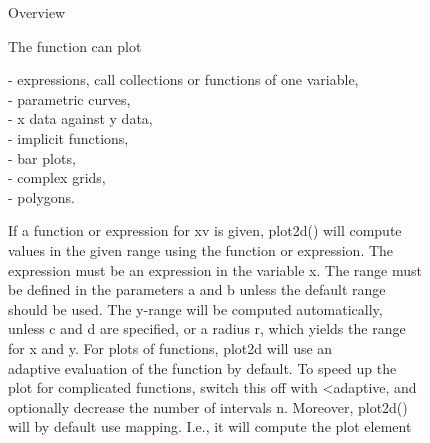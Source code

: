 \documentclass[a4paper,10pt]{article}
\begin{document}
\begin{eulernotebook}
\begin{eulercomment}
\begin{eulercomment}
\begin{eulercomment}
\begin{eulercomment}
\begin{eulercomment}
\begin{eulercomment}
\begin{eulercomment}
\begin{eulercomment}
\begin{eulercomment}
\begin{eulercomment}
\begin{eulercomment}
\begin{eulercomment}
\begin{eulercomment}
\begin{eulercomment}
\begin{eulercomment}
\begin{eulercomment}
\begin{eulercomment}
\begin{eulercomment}
\begin{eulercomment}
\begin{eulercomment}
\begin{eulercomment}
\begin{eulercomment}
\begin{eulercomment}
\begin{eulercomment}
\begin{eulercomment}
\begin{eulercomment}
\begin{eulercomment}
\begin{eulercomment}
\begin{eulercomment}
\begin{eulercomment}
\begin{eulercomment}
\begin{eulercomment}
\begin{eulercomment}
\begin{eulercomment}
\begin{eulercomment}
\begin{eulercomment}
\begin{eulercomment}

Overview

The function can plot

- expressions, call collections or functions of one variable,\\
- parametric curves,\\
- x data against y data,\\
- implicit functions,\\
- bar plots,\\
- complex grids,\\
- polygons.

If a function or expression for xv is given, plot2d() will compute\\
values in the given range using the function or expression. The\\
expression must be an expression in the variable x. The range must\\
be defined in the parameters a and b unless the default range\\
[-2,2] should be used. The y-range will be computed automatically,\\
unless c and d are specified, or a radius r, which yields the range\\
[-r,r] for x and y. For plots of functions, plot2d will use an\\
adaptive evaluation of the function by default. To speed up the\\
plot for complicated functions, switch this off with \textless{}adaptive, and\\
optionally decrease the number of intervals n. Moreover, plot2d()\\
will by default use mapping. I.e., it will compute the plot element\\

\end{eulercomment}
\end{eulercomment}
\end{eulercomment}
\end{eulercomment}
\end{eulercomment}
\end{eulercomment}
\end{eulercomment}
\end{eulercomment}
\end{eulercomment}
\end{eulercomment}
\end{eulercomment}
\end{eulercomment}
\end{eulercomment}
\end{eulercomment}
\end{eulercomment}
\end{eulercomment}
\end{eulercomment}
\end{eulercomment}
\end{eulercomment}
\end{eulercomment}
\end{eulercomment}
\end{eulercomment}
\end{eulercomment}
\end{eulercomment}
\end{eulercomment}
\end{eulercomment}
\end{eulercomment}
\end{eulercomment}
\end{eulercomment}
\end{eulercomment}
\end{eulercomment}
\end{eulercomment}
\end{eulercomment}
\end{eulercomment}
\end{eulercomment}
\end{eulercomment}
\end{eulercomment}
\end{eulernotebook}
\end{document}
